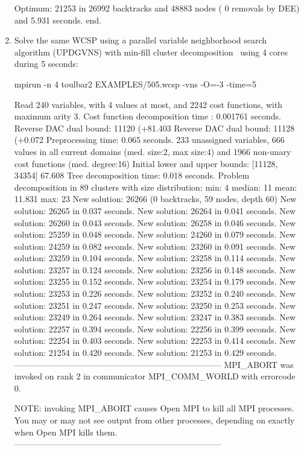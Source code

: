 \begin{enumerate}
{\begin{DoxyCode}
Optimum: 21253 in 26992 backtracks and 48883 nodes ( 0 removals by DEE) and 5.931 seconds.
end.
\end{DoxyCode}}
\item Solve the same WCSP using a parallel variable neighborhood search algorithm (UPDGVNS) with min-fill cluster decomposition~\cite{Ouali17} using 4 cores during 5 seconds:
\begin{DoxyCode}
	mpirun -n 4 toulbar2 EXAMPLES/505.wcsp -vns -O=-3 -time=5
\end{DoxyCode}
{\scriptsize
\begin{DoxyCode}
Read 240 variables, with 4 values at most, and 2242 cost functions, with maximum arity 3.
Cost function decomposition time : 0.001761 seconds.
Reverse DAC dual bound: 11120 (+81.403%
Reverse DAC dual bound: 11128 (+0.072%
Preprocessing time: 0.065 seconds.
233 unassigned variables, 666 values in all current domains (med. size:2, max size:4) and 1966 non-unary cost functions (med. degree:16)
Initial lower and upper bounds: [11128, 34354] 67.608%
Tree decomposition time: 0.018 seconds.
Problem decomposition in 89 clusters with size distribution: min: 4 median: 11 mean: 11.831 max: 23
New solution: 26266 (0 backtracks, 59 nodes, depth 60)
New solution: 26265 in 0.037 seconds.
New solution: 26264 in 0.041 seconds.
New solution: 26260 in 0.043 seconds.
New solution: 26258 in 0.046 seconds.
New solution: 25259 in 0.048 seconds.
New solution: 24260 in 0.079 seconds.
New solution: 24259 in 0.082 seconds.
New solution: 23260 in 0.091 seconds.
New solution: 23259 in 0.104 seconds.
New solution: 23258 in 0.114 seconds.
New solution: 23257 in 0.124 seconds.
New solution: 23256 in 0.148 seconds.
New solution: 23255 in 0.152 seconds.
New solution: 23254 in 0.179 seconds.
New solution: 23253 in 0.226 seconds.
New solution: 23252 in 0.240 seconds.
New solution: 23251 in 0.247 seconds.
New solution: 23250 in 0.253 seconds.
New solution: 23249 in 0.264 seconds.
New solution: 23247 in 0.383 seconds.
New solution: 22257 in 0.394 seconds.
New solution: 22256 in 0.399 seconds.
New solution: 22254 in 0.403 seconds.
New solution: 22253 in 0.414 seconds.
New solution: 21254 in 0.420 seconds.
New solution: 21253 in 0.429 seconds.
--------------------------------------------------------------------------
MPI_ABORT was invoked on rank 2 in communicator MPI_COMM_WORLD 
with errorcode 0.

NOTE: invoking MPI_ABORT causes Open MPI to kill all MPI processes.
You may or may not see output from other processes, depending on
exactly when Open MPI kills them.
--------------------------------------------------------------------------


\end{DoxyCode}}
\end{enumerate}
